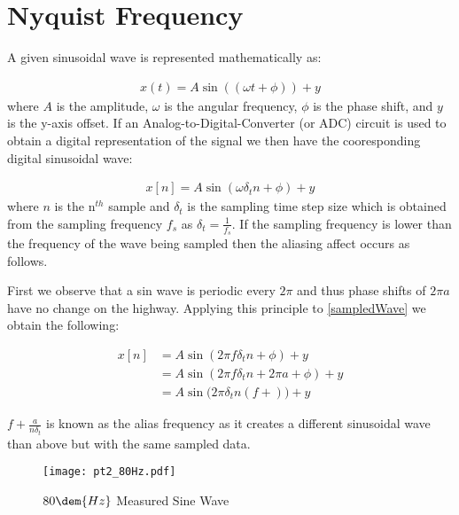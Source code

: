 \documentclass[main.tex]{subfile}
\begin{document}
\section{Nyquist Frequency} 
\label{sec:nyquist_frequency}

A given sinusoidal wave is represented mathematically as:

\begin{align}
  x(t) = A\sin{((\omega t + \phi))} + y
\end{align}
where $A$ is the amplitude, $\omega$ is the angular frequency, $\phi$ is the
phase shift, and $y$ is the y-axis offset. If an Analog-to-Digital-Converter (or
ADC) circuit is used to obtain a digital representation of the signal we then
have the cooresponding digital sinusoidal wave: 

\begin{align}
  x[n] = A\sin{(\omega \delta_{t} n + \phi)} + y \label{eq:sampledWave}
\end{align}
where $n$ is the n$^{th}$ sample and $\delta_{t}$ is the sampling time step size
which is obtained from the sampling frequency $f_s$ as $\delta_{t} =
\frac{1}{f_s}$. If the sampling frequency is lower than the frequency of the
wave being sampled then the aliasing affect occurs as follows.

First we observe that a sin wave is periodic every $2\pi$ and thus phase shifts
of $2\pi a$ have no change on the highway. Applying this principle to \eqref{sampledWave}
we obtain the following:

\begin{align}
  x[n] &= A\sin{(2\pi f \delta_{t} n + \phi)} + y \label{eq:sampledWave}
  \\&= A\sin{(2\pi f \delta_{t} n + 2\pi a + \phi)} + y
  \\&= A\sin{(2\pi \delta_{t} n (f + )}) + y
\end{align}

$f + \frac{a}{n\delta_{t}}$ is known as the alias frequency as it creates a different
sinusoidal wave than above but with the same sampled data.


\begin{figure}[H]
  \begin{center}
    \texttt{[image: pt2\_80Hz.pdf]}
  \end{center}
  \caption{$80\dem{Hz}$ Measured Sine Wave}
  \label{fig:pt280hz}
\end{figure}
\end{document}
